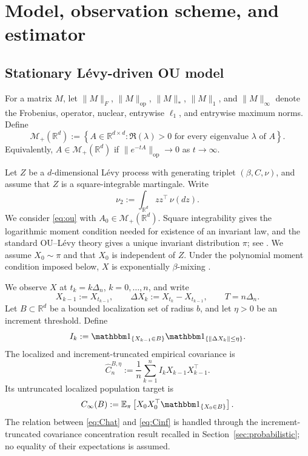 \documentclass[12pt]{article}
\theoremstyle{definition}
\begin{document}
	\section{Model, observation scheme, and estimator}\label{sec:model}
	
	\subsection{Stationary L\'evy-driven OU model}
	
	For a matrix $M$, let $\|M\|_F$, $\|M\|_{\mathrm{op}}$, $\|M\|_*$, $\|M\|_1$, and $\|M\|_\infty$ denote the Frobenius, operator, nuclear, entrywise $\ell_1$, and entrywise maximum norms. Define
	\[\mathcal M_+(\mathbb R^d):=\left\{A\in\mathbb R^{d\times d}:\Re(\lambda)>0
	\text{ for every eigenvalue }\lambda\text{ of }A\right\}.\]
	Equivalently, $A\in\mathcal M_+(\mathbb R^d)$ if $\|e^{-tA}\|_{\mathrm{op}}\to0$ as $t\to\infty$.
	
	Let $Z$ be a $d$-dimensional L\'evy process with generating triplet $(\beta,C,\nu)$, and assume that $Z$ is a square-integrable martingale. Write
	\begin{equation}
		\nu_2:=\int_{\mathbb R^d}zz^\top\,\nu(dz).\label{eq:nu2}
	\end{equation}
	We consider \eqref{eq:ou} with $A_0\in\mathcal M_+(\mathbb R^d)$. Square integrability gives the logarithmic moment condition needed for existence of an invariant law, and the standard OU--L\'evy theory gives a unique invariant distribution $\pi$; see \citep{SatoYamazato1984,Masuda2004}. We assume $X_0\sim\pi$ and that $X_0$ is independent of $Z$. Under the polynomial moment condition imposed below, $X$ is exponentially $\beta$-mixing \citep{Masuda2004}.
	
	We observe $X$ at $t_k=k\Delta_n$, $k=0,\ldots,n$, and write
	\[X_{k-1}:=X_{t_{k-1}},\qquad \Delta X_k:=X_{t_k}-X_{t_{k-1}},\qquad T=n\Delta_n.\]
	Let $B\subset\mathbb R^d$ be a bounded localization set of radius $b$, and let $\eta>0$ be an increment threshold. Define
	\begin{equation}
		I_k:=\mathbbm 1_{\{X_{k-1}\in B\}} \mathbbm 1_{\{\|\Delta X_k\|\le\eta\}}.
		\label{eq:filter}
	\end{equation}
	The localized and increment-truncated empirical covariance is
	\begin{equation}
		\widehat C_n^{B,\eta}:=\frac{1}{n}\sum_{k=1}^n I_kX_{k-1}X_{k-1}^\top. \label{eq:Chat}
	\end{equation}
	Its untruncated localized population target is
	\begin{equation}
		C_\infty(B):= \mathbb E_\pi\left[X_0X_0^\top\mathbbm1_{\{X_0\in B\}}\right].
		\label{eq:Cinf}
	\end{equation}
	The relation between \eqref{eq:Chat} and \eqref{eq:Cinf} is handled through the increment-truncated covariance concentration result recalled in Section~\ref{sec:probabilistic}; no equality of their expectations is assumed.
	
\end{document}
